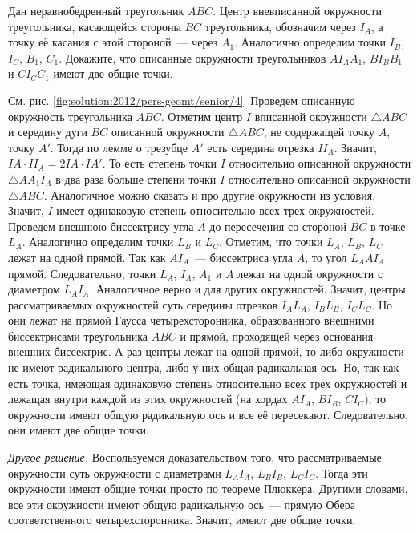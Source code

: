 Дан неравнобедренный треугольник $ABC$.
Центр вневписанной окружности треугольника, касающейся стороны $BC$
треугольника, обозначим через $I_A$, а точку её касания с этой стороной~---
через $A_1$.
Аналогично определим точки $I_B$, $I_C$, $B_1$, $C_1$.
Докажите, что описанные окружности треугольников
$A I_A A_1$, $B I_B B_1$ и $C I_C C_1$ имеют две общие точки.

%
\label{solution:2012/pers-geomt/senior/4}%
См. рис. \ref{fig:solution:2012/pers-geomt/senior/4}.
Проведем описанную окружность треугольника $ABC$.
Отметим центр $I$ вписанной окружности $\triangle ABC$ и середину дуги $BC$
описанной окружности $\triangle ABC$, не содержащей точку $A$, точку $A'$.
Тогда по лемме о трезубце $A'$ есть середина отрезка $I I_A$.
Значит, $I A \cdot I I_A = 2 I A \cdot I A'$.
То есть степень точки $I$ относительно описанной окружности
$\triangle A A_1 I_A$ в два раза больше степени точки $I$ относительно описанной
окружности $\triangle ABC$.
Аналогичное можно сказать и про другие окружности из условия.
Значит, $I$ имеет одинаковую степень относительно всех трех окружностей.
Проведем внешнюю биссектрису угла $A$ до пересечения со стороной $BC$ в
точке $L_A$.
Аналогично определим точки $L_B$ и $L_C$.
Отметим, что точки $L_A$, $L_B$, $L_C$ лежат на одной прямой.
Так как $AI_A$~--- биссектриса угла $A$, то угол $L_AAI_A$ прямой.
Следовательно, точки $L_A$, $I_A$, $A_1$ и $A$ лежат на одной окружности с
диаметром $L_AI_A$.
Аналогичное верно и для других окружностей.
Значит, центры рассматриваемых окружностей суть середины отрезков
$I_A L_A$, $I_B L_B$, $I_C L_C$.
Но они лежат на прямой Гаусса четырехсторонника, образованного внешними
биссектрисами треугольника $ABC$ и прямой, проходящей через основания внешних
биссектрис.
А раз центры лежат на одной прямой, то либо окружности не имеют радикального
центра, либо у них общая радикальная ось.
Но, так как есть точка, имеющая одинаковую степень относительно всех трех
окружностей и лежащая внутри каждой из этих окружностей
(на хордах $A I_A$, $B I_B$, $C I_C$),
то окружности имеют общую радикальную ось и все её пересекают.
Следовательно, они имеют две общие точки.
\par
\emph{Другое решение.}
Воспользуемся доказательством того, что рассматриваемые окружности суть
окружности с диаметрами $L_A I_A$, $L_B I_B$, $L_C I_C$.
Тогда эти окружности имеют общие точки просто по теореме Плюккера.
Другими словами, все эти окружности имеют общую радикальную ось~---
прямую Обера соответственного четырехсторонника.
Значит, имеют две общие точки.

